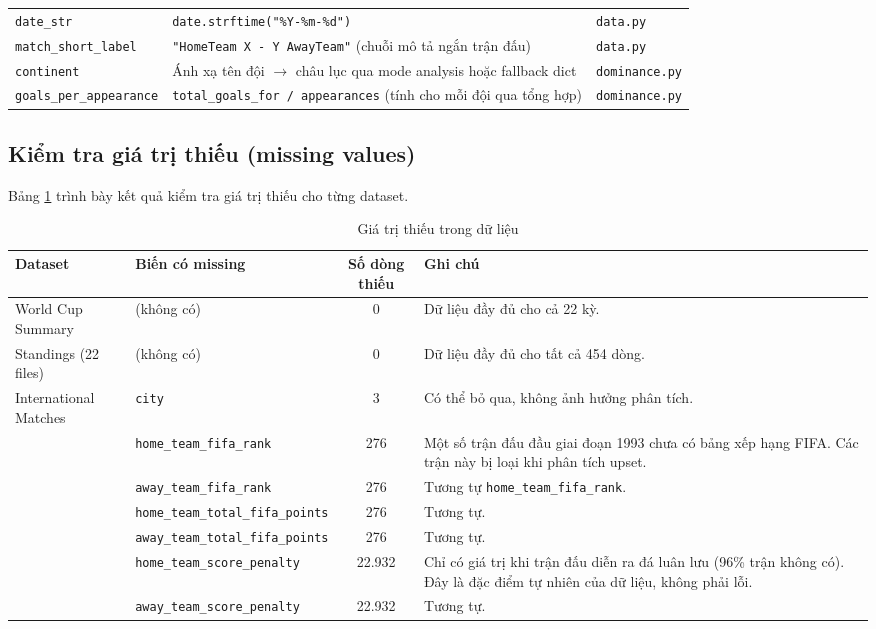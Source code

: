 \documentclass[12pt,a4paper]{article}
\begin{document}
\begin{table}[H]
\begin{tabular}{lp{8cm}l}
\texttt{date\_str} & \texttt{date.strftime("\%Y-\%m-\%d")} & \texttt{data.py} \\
\texttt{match\_short\_label} & \texttt{"HomeTeam X - Y AwayTeam"} (chuỗi mô tả ngắn trận đấu) & \texttt{data.py} \\
\texttt{continent} & Ánh xạ tên đội $\rightarrow$ châu lục qua mode analysis hoặc fallback dict & \texttt{dominance.py} \\
\texttt{goals\_per\_appearance} & \texttt{total\_goals\_for / appearances} (tính cho mỗi đội qua tổng hợp) & \texttt{dominance.py} \\
\bottomrule
\end{tabular}
\end{table}

\subsection{Kiểm tra giá trị thiếu (missing values)}
Bảng \ref{tab:missing_values} trình bày kết quả kiểm tra giá trị thiếu cho từng dataset.

\begin{table}[H]
\centering
\caption{Giá trị thiếu trong dữ liệu}
\label{tab:missing_values}
\begin{tabular}{llcp{7.5cm}}
\toprule
\textbf{Dataset} & \textbf{Biến có missing} & \textbf{Số dòng thiếu} & \textbf{Ghi chú} \\
\midrule
World Cup Summary & (không có) & 0 & Dữ liệu đầy đủ cho cả 22 kỳ. \\
Standings (22 files) & (không có) & 0 & Dữ liệu đầy đủ cho tất cả 454 dòng. \\
International Matches & \texttt{city} & 3 & Có thể bỏ qua, không ảnh hưởng phân tích. \\
 & \texttt{home\_team\_fifa\_rank} & 276 & Một số trận đấu đầu giai đoạn 1993 chưa có bảng xếp hạng FIFA. Các trận này bị loại khi phân tích upset. \\
 & \texttt{away\_team\_fifa\_rank} & 276 & Tương tự \texttt{home\_team\_fifa\_rank}. \\
 & \texttt{home\_team\_total\_fifa\_points} & 276 & Tương tự. \\
 & \texttt{away\_team\_total\_fifa\_points} & 276 & Tương tự. \\
 & \texttt{home\_team\_score\_penalty} & 22.932 & Chỉ có giá trị khi trận đấu diễn ra đá luân lưu (96\% trận không có). Đây là đặc điểm tự nhiên của dữ liệu, không phải lỗi. \\
 & \texttt{away\_team\_score\_penalty} & 22.932 & Tương tự. \\
\bottomrule
\end{tabular}
\end{table}
\end{document}
